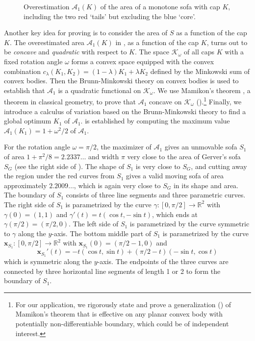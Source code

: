 \begin{figure}
\centering

\caption{Overestimation \(\mathcal{A}_1(K)\) of the area of a monotone sofa with cap \(K\), including the two red ‘tails’ but excluding the blue ‘core’.}
\label{fig:a1-upper-bound}
\end{figure}

Another key idea for proving  is to consider the area of \(S\) as a function of the cap \(K\). The overestimated area \(\mathcal{A}_1(K)\) in , as a function of the cap \(K\), turns out to be \emph{concave} and \emph{quadratic} with respect to \(K\). The space \(\mathcal{K}_\omega\) of all caps \(K\) with a fixed rotation angle \(\omega\) forms a convex space equipped with the convex combination \(c_\lambda(K_1, K_2) = (1 - \lambda) K_1 + \lambda K_2\) defined by the Minkowski sum of convex bodies. Then the Brunn-Minkowski theory on convex bodies \cite{schneider_2013} is used to establish that \(\mathcal{A}_1\) is a quadratic functional on \(\mathcal{K}_\omega\). We use Mamikon’s theorem \autocite{mnatsakanianAnnularRingsEqual1997}, a theorem in classical geometry, to prove that \(\mathcal{A}_1\) concave on \(\mathcal{K}_\omega\) ().\footnote{For our application, we rigorously state and prove a generalization () of Mamikon’s theorem that is effective on any planar convex body with potentially non-differentiable boundary, which could be of independent interest.} Finally, we introduce a calculus of variation based on the Brunn-Minkowski theory to find a global optimum \(K_1\) of \(\mathcal{A}_1\).  is established by computing the maximum value \(\mathcal{A}_1(K_1) = 1 + \omega^2/2\) of \(\mathcal{A}_1\).

For the rotation angle \(\omega = \pi/2\), the maximizer of \(\mathcal{A}_1\) gives an unmovable sofa \(S_1\) of area \(1 + \pi^2/8 = 2.2337\dots\) and width \(\pi\) very close to the area of Gerver’s sofa \(S_G\) (see the right side of ). The shape of \(S_1\) is very close to \(S_G\), and cutting away the region under the red curves from \(S_1\) gives a valid moving sofa of area approximately \(2.2009\dots\), which is again very close to \(S_G\) in its shape and area. The boundary of \(S_1\) consists of three line segments and three parametric curves. The right side of \(S_1\) is parametrized by the curve \(\gamma : [0, \pi/2] \to \mathbb{R}^2\) with \(\gamma(0) = (1, 1)\) and \(\gamma'(t) = t(\cos t, -\sin t)\), which ends at \(\gamma(\pi/2) = (\pi/2, 0)\). The left side of \(S_1\) is parametrized by the curve symmetric to \(\gamma\) along the \(y\)-axis. The bottom middle part of \(S_1\) is parametrized by the curve \(\mathbf{x}_{S_1} : [0, \pi/2] \to \mathbb{R}^2\) with \(\mathbf{x}_{S_1}(0) = (\pi/2-1, 0)\) and
\[
\mathbf{x}_{S_1}'(t) = -t (\cos t, \sin t) + (\pi/2- t) (-\sin t, \cos t)
\]
which is symmetric along the \(y\)-axis. The endpoints of the three curves are connected by three horizontal line segments of length 1 or 2 to form the boundary of \(S_1\).